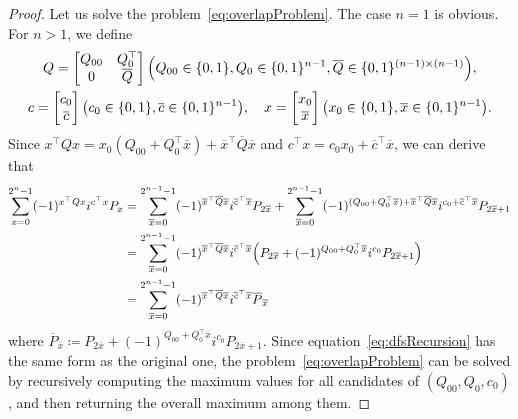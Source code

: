 \documentclass[aps,prx,onecolumn,superscriptaddress,nobibnotes,nofootinbib]{revtex4-2}
\newcommand{\black}[1]{\textcolor{black}{#1}}
\newcommand{\defeq}{\coloneqq}
\begin{document}
\begin{proof}
  Let us solve the problem~\eqref{eq:overlapProblem}. The case $n=1$ is obvious.
  For $n>1$, we define
  \begin{gather*}
    Q = \begin{bmatrix}
      Q_{00} & Q_{0}^\top   \\
      0      & \overline{Q}
    \end{bmatrix} \qty(Q_{00} \in \{0,1\}, Q_0 \in \{0,1\}^{n-1}, \overline{Q} \in \{0,1\}^{(n-1) \times (n-1)}),\\
    c = \begin{bmatrix}
      c_0 \\
      \overline{c}
    \end{bmatrix} \qty(c_0 \in \{0,1\}, \overline{c} \in \{0,1\}^{n-1}),\quad
    x = \begin{bmatrix}
      x_0 \\
      \overline{x}
    \end{bmatrix} \qty(x_0 \in \{0,1\}, \overline{x} \in \{0,1\}^{n-1}).
  \end{gather*}
  Since
  $x^\top Q x = x_0 (Q_{00}+Q_0^\top \overline{x}) + \overline{x}^\top \overline{Q} \overline{x}$
  and
  $c^\top x = c_0 x_0 + \overline{c}^\top \overline{x}$,
  we can derive that
  \begin{align}
    \sum_{x=0}^{2^n-1} (-1)^{x^\top Q x} i^{c^\top x} P_x
     & = \black{\sum_{\overline{x}=0}^{2^{n-1}-1} (-1)^{\overline{x}^\top \overline{Q} \overline{x}} i^{\overline{c}^\top \overline{x}}
    P_{2\overline{x}}+\sum_{\overline{x}=0}^{2^{n-1}-1} (-1)^{ (Q_{00}+Q_0^\top \overline{x}) + \overline{x}^\top \overline{Q} \overline{x}} i^{c_0+\overline{c}^\top \overline{x}}P_{2\overline{x}+1}}                                   \notag \\
     & = \sum_{\overline{x}=0}^{2^{n-1}-1} (-1)^{\overline{x}^\top \overline{Q} \overline{x}} i^{\overline{c}^\top \overline{x}}
    \qty(P_{2\overline{x}} + (-1)^{Q_{00}+Q_0^\top \overline{x}} i^{c_0} P_{2\overline{x}+1})                                   \notag                                                                                                           \\
     & = \sum_{\overline{x}=0}^{2^{n-1}-1} (-1)^{\overline{x}^\top \overline{Q} \overline{x}} i^{\overline{c}^\top \overline{x}} \overline{P}_{\overline{x}} \label{eq:dfsRecursion}
  \end{align}
  where $\overline{P}_{\overline{x}} \defeq P_{2\overline{x}} + (-1)^{Q_{00}+Q_0^\top \overline{x}} i^{c_0} P_{2\overline{x}+1}$.
  Since equation~\eqref{eq:dfsRecursion} has the same form as the original one, the problem~\eqref{eq:overlapProblem} can be solved by recursively computing the maximum values for all candidates of $(Q_{00}, Q_0, c_0)$, and then returning the overall maximum among them.


\end{proof}
\end{document}

